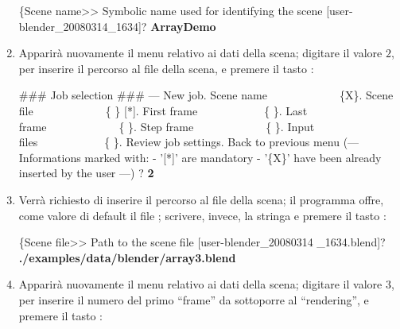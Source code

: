 \begin{enumerate}
\begin{mgCodeBox}
\small
\{Scene name>> Symbolic name used for identifying the scene [user-blender\_20080314\_1634]? \textbf{ArrayDemo}
\end{mgCodeBox}
\item Apparir\`a nuovamente il menu relativo ai dati della scena; digitare il valore $2$, per inserire il percorso al file della scena, e premere il tasto :
\begin{mgCodeBox}
\small
\#\#\# Job selection \#\#\#\newline
--- New job. Scene name\ \ \ \ \ \ \ \ \ \ \ \ \ \{X\}. Scene file\ \ \ \ \ \ \ \ \ \ \ \ \ \{ \} [*]. First frame\ \ \ \ \ \ \ \ \ \ \ \ \{ \}. Last frame\ \ \ \ \ \ \ \ \ \ \ \ \ \{ \}. Step frame\ \ \ \ \ \ \ \ \ \ \ \ \ \{ \}. Input files\ \ \ \ \ \ \ \ \ \ \ \ \{ \}. Review job settings. Back to previous menu\newline
(---\newline
 Informations marked with:\newline
 - '[*]' are mandatory\newline
 - '\{X\}' have been already inserted by the user\newline
---)\newline
? \textbf{2}
\end{mgCodeBox}
\item Verr\`a richiesto di inserire il percorso al file della scena; il programma offre, come valore di default il file ; scrivere, invece, la stringa  e premere il tasto :
\begin{mgCodeBox}
\small
\{Scene file>> Path to the scene file [user-blender\_20080314\newline
\_1634.blend]?  \textbf{./examples/data/blender/array3.blend}
\end{mgCodeBox}
\item \label{lbl:exec-array3-startframe-useless} Apparir\`a nuovamente il menu relativo ai dati della scena; digitare il valore $3$, per inserire il numero del primo ``frame'' da sottoporre al ``rendering'', e premere il tasto :

\end{enumerate}
